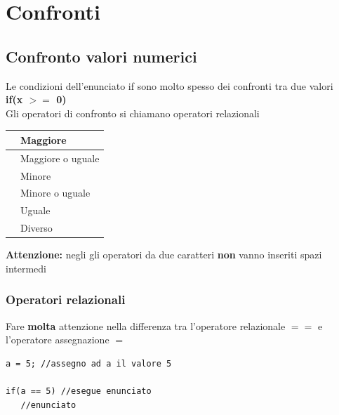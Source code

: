 \section*{Confronti}
\subsection*{Confronto valori numerici}

\begin{frame}
\begin{block}{}
\begin{huge}
\begin{center}
\end{center}
\end{huge}
\end{block}
\end{frame}

\begin{frame}
\begin{block}{}
Le condizioni dell'enunciato if sono molto spesso dei confronti tra due valori\\
\textbf{if(\alert{x $>=$ 0})}\\
Gli operatori di confronto si chiamano operatori relazionali
\end{block}
\begin{block}{}
\centering
\begin{tabular}{|l|l|}
\hline
\textCl{$>$} & Maggiore \\
\hline
\textCl{$>=$} & Maggiore o uguale\\
\hline
\textCl{$<$} & Minore \\
\hline
\textCl{$<=$} & Minore o uguale\\
\hline
\textCl{$==$} & Uguale \\
\hline
\textCl{$!=$} & Diverso\\
\hline
\end{tabular}
\end{block}
\textbf{\alert{Attenzione:}} negli gli operatori da due caratteri \textbf{non} vanno inseriti spazi intermedi 
\end{frame}

\begin{frame}[fragile]
\frametitle{Operatori relazionali}
\begin{block}{}
Fare \textbf{\alert{molta}} attenzione nella differenza tra l'operatore relazionale $==$ e l'operatore assegnazione $=$
\end{block}
\begin{lstlisting}
a = 5; //assegno ad a il valore 5

if(a == 5) //esegue enunciato
   //enunciato
\end{lstlisting}
\end{frame}

